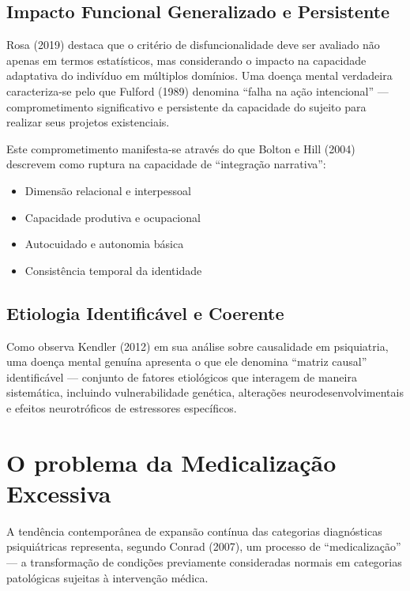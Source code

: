 \subsection{Impacto Funcional Generalizado e Persistente}

Rosa (2019) destaca que o critério de disfuncionalidade deve ser avaliado não apenas em termos estatísticos, mas considerando o impacto na capacidade adaptativa do indivíduo em múltiplos domínios. Uma doença mental verdadeira caracteriza-se pelo que Fulford (1989) denomina \enquote{falha na ação intencional} --- comprometimento significativo e persistente da capacidade do sujeito para realizar seus projetos existenciais.

Este comprometimento manifesta-se através do que Bolton e Hill (2004) descrevem como ruptura na capacidade de \enquote{integração narrativa}:

\begin{itemize}
\item Dimensão relacional e interpessoal
\item Capacidade produtiva e ocupacional
\item Autocuidado e autonomia básica
\item Consistência temporal da identidade
\end{itemize}

\subsection{Etiologia Identificável e Coerente}

Como observa Kendler (2012) em sua análise sobre causalidade em psiquiatria, uma doença mental genuína apresenta o que ele denomina \enquote{matriz causal} identificável --- conjunto de fatores etiológicos que interagem de maneira sistemática, incluindo vulnerabilidade genética, alterações neurodesenvolvimentais e efeitos neurotróficos de estressores específicos.

\section{O problema da Medicalização Excessiva}
\label{sec:medicalizacao}

A tendência contemporânea de expansão contínua das categorias diagnósticas psiquiátricas representa, segundo Conrad (2007), um processo de \enquote{medicalização} --- a transformação de condições previamente consideradas normais em categorias patológicas sujeitas à intervenção médica.

